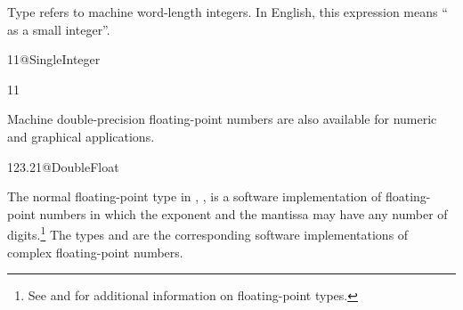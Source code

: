 {{{{{{{{\begin{xtc}
\end{xtc}
\begin{xtc}
\begin{xtccomment}
Type  refers to machine word-length
integers.
In English, this expression means `` as a small
integer''.
\end{xtccomment}
\begin{spadsrc}
11@SingleInteger
\end{spadsrc}
\begin{TeXOutput}
\begin{fricasmath}{8}
11%
\end{fricasmath}
\end{TeXOutput}
\end{xtc}
\begin{xtc}
\begin{xtccomment}
Machine double-precision floating-point numbers are also
available for numeric and graphical
applications.
\end{xtccomment}
\begin{spadsrc}
123.21@DoubleFloat
\end{spadsrc}
\begin{TeXOutput}
\begin{fricasmath}{9}
%
\end{fricasmath}
\end{TeXOutput}
\end{xtc}

The normal floating-point type in \Language{}, ,
is a software implementation of floating-point numbers in which
the exponent and the mantissa may have any number of
digits.\footnote{See  and  for
additional information on floating-point types.}
The types  and
 are the corresponding software
implementations of complex floating-point numbers.

}}}}}}}}
